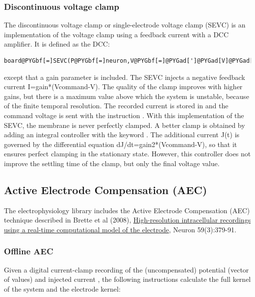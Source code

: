 \documentclass[letterpaper,10pt,english]{manual}
\begin{document}
\subsubsection{Discontinuous voltage clamp}

The discontinuous voltage clamp or single-electrode voltage clamp (SEVC) is
an implementation of the voltage clamp using a feedback current with a DCC
amplifier. It is defined as the DCC:

\begin{Verbatim}[commandchars=@\[\]]
board@PYGbf[=]SEVC(P@PYGbf[=]neuron,V@PYGbf[=]@PYGad[']@PYGad[V]@PYGad['],I@PYGbf[=]@PYGad[']@PYGad[I]@PYGad['],frequency@PYGbf[=]@PYGaw[2]@PYGbf[*]kHz,gain@PYGbf[=]@PYGaw[10]@PYGbf[*]nS)
\end{Verbatim}

except that a gain parameter is included. The SEVC injects a negative
feedback current I=gain*(Vcommand-V). The quality of the clamp improves with
higher gains, but there is a maximum value above which the system is unstable,
because of the finite temporal resolution.
The recorded current is stored in  and the command voltage is sent
with the instruction .
With this implementation of the SEVC, the membrane is never perfectly clamped.
A better clamp is obtained by adding an integral controller with the keyword
. The additional current J(t) is governed by the differential
equation dJ/dt=gain2*(Vcommand-V), so that it ensures perfect clamping in the
stationary state.
However, this controller does not improve the settling time of the clamp, but
only the final voltage value.


\subsection{Active Electrode Compensation (AEC)}

The electrophysiology library includes the Active Electrode Compensation (AEC) technique
described in Brette et al (2008),
\href{http://www.di.ens.fr/\textasciitilde{}brette/papers/Brette2008Neuron.html}{High-resolution intracellular recordings using a real-time computational model of the electrode},
Neuron 59(3):379-91.


\subsubsection{Offline AEC}

Given a digital current-clamp recording of the (uncompensated) potential 
(vector of values) and injected current , the following instructions
calculate the full kernel of the system and the electrode kernel:
\end{document}
